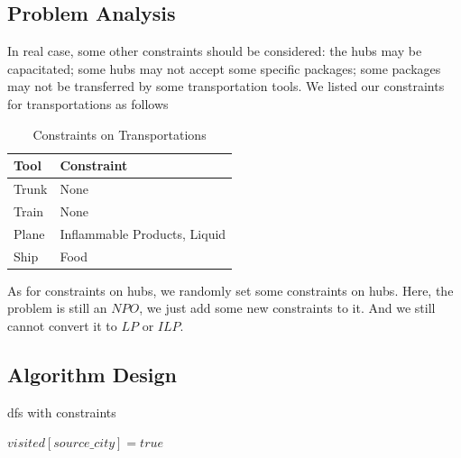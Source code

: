 \documentclass{llncs}
\begin{document}
\subsection{Problem Analysis}
In real case, some other constraints should be considered: the hubs may be capacitated; some hubs may not accept some specific packages; some packages
may not be transferred by some transportation tools. We listed our constraints for transportations as follows \par
\begin{table}
  \caption{Constraints on Transportations}\label{cts1}
  \centering
  \begin{tabular}{|l|l|}
  \hline
  Tool &  Constraint \\
  \hline
  Trunk & None\\
  \hline
  Train & None\\
  \hline
  Plane & Inflammable Products, Liquid \\
  \hline
  Ship & Food \\
  \hline
  \end{tabular}
\end{table}
As for constraints on hubs, we randomly set some constraints on hubs. Here, the problem is still an $NPO$, we just add some new constraints to it.
And we still cannot convert it to $LP$ or $ILP$.
\subsection{Algorithm Design}
\begin{algorithm}
  \BlankLine
  \caption{dfs with constraints}
  \label{Alg-dfs-with-constraints}
  
  \BlankLine 
  
  $visited[source\_city] = true$\;

\end{algorithm}
\end{document}
